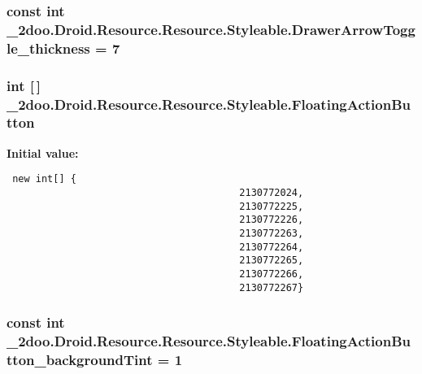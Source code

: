 \hypertarget{class__2doo_1_1_droid_1_1_resource_1_1_styleable_3d7b1d8d6b7afaae55f6b41baaf5ea59}{
\subsubsection[{DrawerArrowToggle\_\-thickness}]{\setlength{\rightskip}{0pt plus 5cm}const int \_\-2doo.Droid.Resource.Resource.Styleable.DrawerArrowToggle\_\-thickness = 7}}
\label{class__2doo_1_1_droid_1_1_resource_1_1_styleable_3d7b1d8d6b7afaae55f6b41baaf5ea59}


\hypertarget{class__2doo_1_1_droid_1_1_resource_1_1_styleable_bf3e8d88f5af122063295160622c9926}{
\subsubsection[{FloatingActionButton}]{\setlength{\rightskip}{0pt plus 5cm}int \mbox{[}$\,$\mbox{]} \_\-2doo.Droid.Resource.Resource.Styleable.FloatingActionButton}}
\label{class__2doo_1_1_droid_1_1_resource_1_1_styleable_bf3e8d88f5af122063295160622c9926}


\textbf{Initial value:}

\begin{Code}\begin{verbatim} new int[] {
                                        2130772024,
                                        2130772225,
                                        2130772226,
                                        2130772263,
                                        2130772264,
                                        2130772265,
                                        2130772266,
                                        2130772267}
\end{verbatim}
\end{Code}
\hypertarget{class__2doo_1_1_droid_1_1_resource_1_1_styleable_8102d7862cb90c37b5c5872ba4eba819}{
\subsubsection[{FloatingActionButton\_\-backgroundTint}]{\setlength{\rightskip}{0pt plus 5cm}const int \_\-2doo.Droid.Resource.Resource.Styleable.FloatingActionButton\_\-backgroundTint = 1}}
\label{class__2doo_1_1_droid_1_1_resource_1_1_styleable_8102d7862cb90c37b5c5872ba4eba819}


